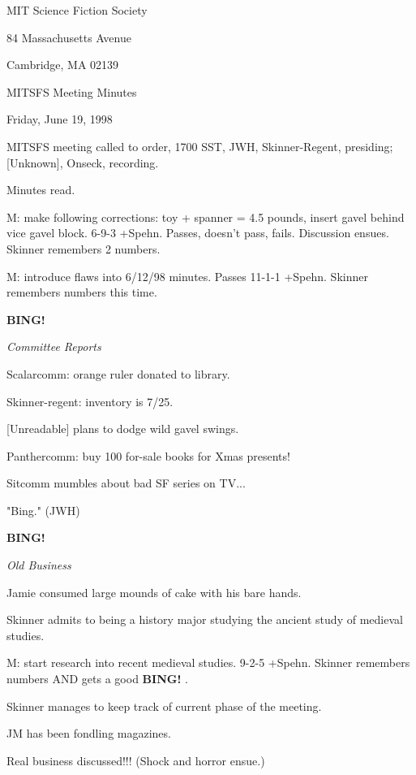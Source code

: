 \documentclass[12pt]{article}
\newcommand{\bing}{{\bf BING!} }
\newcommand{\goto}[1]{\bing \vskip 12pt \centerline{{\em{#1}}}}
\begin{document}
\begin{center}

MIT Science Fiction Society 

84 Massachusetts Avenue

Cambridge, MA 02139

\vspace{12pt}

MITSFS Meeting Minutes 

Friday, June 19, 1998

\end{center}
 
\vspace{18pt}

\setlength{\parskip}{6pt}

\noindent
MITSFS meeting called to order, 1700 SST,
JWH, Skinner-Regent, presiding; [Unknown], Onseck, recording.

Minutes read.

M: make following corrections: toy + spanner = 4.5 pounds, insert gavel behind vice gavel block. 6-9-3 +Spehn. Passes, doesn't pass, fails. Discussion ensues. Skinner remembers 2 numbers.

M: introduce flaws into 6/12/98 minutes. Passes 11-1-1 +Spehn. Skinner remembers numbers this time.

\goto{Committee Reports}

Scalarcomm: orange ruler donated to library.

Skinner-regent: inventory is 7/25.

[Unreadable] plans to dodge wild gavel swings.

Panthercomm: buy 100 for-sale books for Xmas presents!

Sitcomm mumbles about bad SF series on TV...

"Bing." (JWH)

\goto{Old Business}

Jamie consumed large mounds of cake with his bare hands.

Skinner admits to being a history major studying the ancient study of medieval studies.

M: start research into recent medieval studies. 9-2-5 +Spehn. Skinner remembers numbers AND gets a good \bing.

Skinner manages to keep track of current phase of the meeting.

JM has been fondling magazines.

Real business discussed!!! (Shock and horror ensue.)
\end{document}
